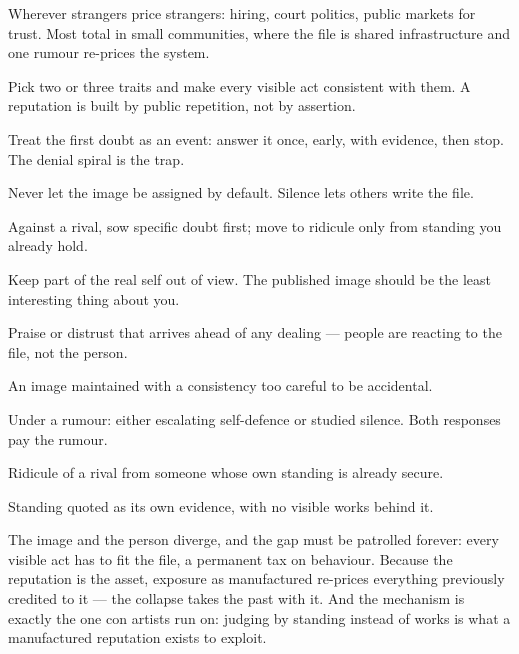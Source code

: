 \begin{conditions}
Wherever strangers price strangers: hiring, court politics, public markets for trust. Most total in small communities, where the file is shared infrastructure and one rumour re-prices the system.
\end{conditions}

\begin{application}
  \item Pick two or three traits and make every visible act consistent with them. A reputation is built by public repetition, not by assertion.
  \item Treat the first doubt as an event: answer it once, early, with evidence, then stop. The denial spiral is the trap.
  \item Never let the image be assigned by default. Silence lets others write the file.
  \item Against a rival, sow specific doubt first; move to ridicule only from standing you already hold.
  \item Keep part of the real self out of view. The published image should be the least interesting thing about you.
\end{application}

\begin{feedback}
  \item Praise or distrust that arrives ahead of any dealing --- people are reacting to the file, not the person.
  \item An image maintained with a consistency too careful to be accidental.
  \item Under a rumour: either escalating self-defence or studied silence. Both responses pay the rumour.
  \item Ridicule of a rival from someone whose own standing is already secure.
  \item Standing quoted as its own evidence, with no visible works behind it.
\end{feedback}

\begin{failure}
The image and the person diverge, and the gap must be patrolled forever: every visible act has to fit the file, a permanent tax on behaviour. Because the reputation is the asset, exposure as manufactured re-prices everything previously credited to it --- the collapse takes the past with it. And the mechanism is exactly the one con artists run on: judging by standing instead of works is what a manufactured reputation exists to exploit.
\end{failure}

